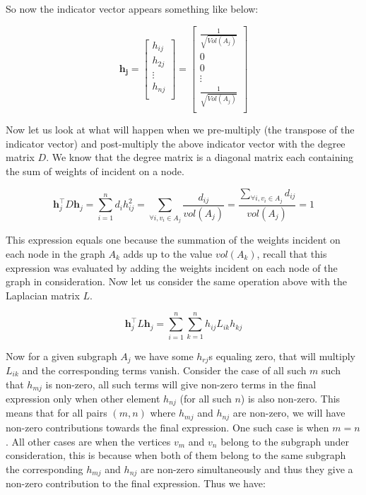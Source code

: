\documentclass[english]{article}
\theoremstyle{plain}
\begin{document}
So now the indicator vector appears something like below:

\begin{equation}
\boldsymbol{h_{j}} = 
\begin{bmatrix}
h_{ij}\\
h_{2j}\\
\vdots\\
h_{nj}\\
\end{bmatrix} = 
\begin{bmatrix}
\frac{1}{\sqrt{Vol(A_{j})}} \\
0 \\
0 \\
\vdots \\
\frac{1}{\sqrt{Vol(A_{j})}} \\
\end{bmatrix}
\end{equation}

Now let us look at what will happen when we pre-multiply (the transpose of the indicator vector) and post-multiply the above indicator vector with the degree matrix $D$. We know that the degree matrix is a diagonal matrix each containing the sum of weights of incident on a node. 

\begin{equation}
\boldsymbol{h}_{j}^{\top}D\boldsymbol{h}_{j} = \sum_{i=1}^{n} d_{i}h^{2}_{ij} = \sum_{\forall i,v_{i} \in A_{j}} \frac{d_{ij}}{vol(A_{j})} = \frac{\sum_{\forall i,v_{i} \in A_{j}}d_{ij}}{vol(A_{j})}  = 1
\end{equation}

This expression equals one because the summation of the weights incident on each node in the graph $A_{k}$ adds up to the value $vol(A_{k})$, recall that this expression was evaluated by adding the weights incident on each node of the graph in consideration. Now let us consider the same operation above with the Laplacian matrix $L$.

\begin{equation}
\boldsymbol{h}_{j}^{\top}L\boldsymbol{h}_{j} = \sum_{i=1}^{n}\sum_{k=1}^{n} h_{ij}L_{ik}h_{kj}
\end{equation}

Now for a given subgraph $A_{j}$ we have some $h_{rj}$s equaling zero, that will multiply $L_{ik}$ and the corresponding terms vanish. Consider the case of all such $m$ such that $h_{mj}$ is non-zero, all such terms will give non-zero terms in the final expression only when other element $h_{nj}$ (for all such $n$) is also non-zero. This means that for all pairs $(m,n)$ where $h_{mj}$ and $h_{nj}$ are non-zero, we will have non-zero contributions towards the final expression. One such case is when $m=n$. All other cases are when the vertices $v_{m}$ and $v_{n}$ belong to the subgraph under consideration, this is because when both of them belong to the same subgraph the corresponding $h_{mj}$ and $h_{nj}$ are non-zero simultaneously and thus they give a non-zero contribution to the final expression. Thus we have:
\end{document}
